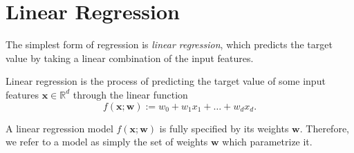 
\section{Linear Regression}
The simplest form of regression is \emph{linear regression}, which predicts the target value by taking a linear combination of the input features.

\begin{definition}
    Linear regression is the process of predicting the target value of some input features $\bm x \in \mathbb R^d$ through the linear function
    \begin{equation}
        \label{eq:linreg}
        f(\bm x; \bm w) := w_0 + w_1 x_1 + \ldots + w_d x_d.
    \end{equation}
\end{definition}

A linear regression model $f(\bm x; \bm w)$ is fully specified by its weights $\bm w$. Therefore, we refer to a model as simply the set of weights $\bm w$ which parametrize it.

